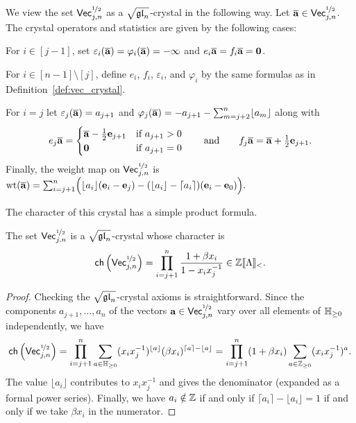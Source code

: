 \documentclass[11pt]{article}
\begin{document}
\begin{definition}
\label{def:vec_crystal2}
We view the set $\mathsf{Vec}^{\nicefrac{1}{2}}_{j,n}$ as a $\sqrt{\mathfrak{gl}_n}$-crystal in the following way.
Let $\overline{\mathbf{a}} \in \mathsf{Vec}^{\nicefrac{1}{2}}_{j,n}$.
The crystal operators and statistics are given by the following cases:
\bei
\item[(a)] For $i \in [j-1]$, set $\varepsilon_i(\overline{\mathbf{a}}) =\varphi_i(\overline{\mathbf{a}})= -\infty$ and $e_i \overline{\mathbf{a}} = f_i \overline{\mathbf{a}} = \boldsymbol{0}$.
\item[(b)] For $i \in [n-1] \setminus [j]$, define $e_i$, $f_i$, $\varepsilon_i$, and $\varphi_i$ by the same formulas as in Definition~\ref{def:vec_crystal}.

\item[(c)] For $i = j$ let $\varepsilon_j(\overline{\mathbf{a}}) = a_{j+1}$
and 
$\varphi_j(\overline{\mathbf{a}})  = -a_{j+1} - \sum_{m=j+2}^n \lfloor a_m \rfloor$ along with
\[
e_j \overline{\mathbf{a}}  = \begin{cases} \overline{\mathbf{a}} - \frac{1}{2} \textbf{e}_{j+1} & \text{if } a_{j+1} > 0 \\
\boldsymbol{0} & \text{if } a_{j+1} = 0
\end{cases}
\qquad\text{and}\qquad
f_j \overline{\mathbf{a}}  = \overline{\mathbf{a}} + \tfrac{1}{2} \textbf{e}_{j+1}.
\]
\eei
Finally, the weight map on $\mathsf{Vec}^{\nicefrac{1}{2}}_{j,n}$ is 
$\operatorname{wt}(\overline{\mathbf{a}})  
 = \sum_{i=j+1}^n \Bigl( \lfloor a_i \rfloor (\textbf{e}_i - \textbf{e}_j) - (\lfloor a_i \rfloor - \lceil a_i \rceil) (\textbf{e}_i - \textbf{e}_0) \Bigr).
$
\end{definition}


The character of this crystal has a simple product formula.

\begin{proposition}
\label{prop:infinite_row_char}
The set $\mathsf{Vec}^{\nicefrac{1}{2}}_{j,n}$ is a $\sqrt{\mathfrak{gl}_n}$-crystal whose character is
\[
\mathsf{ch}\left(\mathsf{Vec}^{\nicefrac{1}{2}}_{j,n}\right) = \prod_{i=j+1}^n \frac{1 + \beta x_i}{1 - x_i x_j^{-1}} \in \mathbb{Z}\llbracket\Lambda\rrbracket_<.
\]
\end{proposition}

\begin{proof}
Checking the $\sqrt{\mathfrak{gl}_n}$-crystal axioms is straightforward.
Since the components $a_{j+1},\dots,a_n$ of the vectors $\mathbf{a} \in \mathsf{Vec}^{\nicefrac{1}{2}}_{j,n}$ vary over all elements of $\mathbb{H}_{\geq0}$ independently, we have 
\[
\mathsf{ch}\left(\mathsf{Vec}^{\nicefrac{1}{2}}_{j,n}\right) = \prod_{i=j+1}^n \sum_{a \in \mathbb{H}_{\geq0}}  (x_ix_j^{-1})^{\lfloor a \rfloor} (\beta x_i)^{\lceil a \rceil - \lfloor a \rfloor} = \prod_{i=j+1}^n (1+\beta x_i)\sum_{a\in\mathbb{Z}_{\geq 0}}  (x_ix_j^{-1})^{a}.
\]
The value $\lfloor a_i \rfloor$ contributes to $x_i x_j^{-1}$ and gives the denominator (expanded as a formal power series).
Finally, we have $a_i \notin \mathbb{Z}$ if and only if $\lceil a_i \rceil - \lfloor a_i \rfloor = 1$ if and only if we take   $\beta x_i$ in the numerator.
\end{proof}
\end{document}
